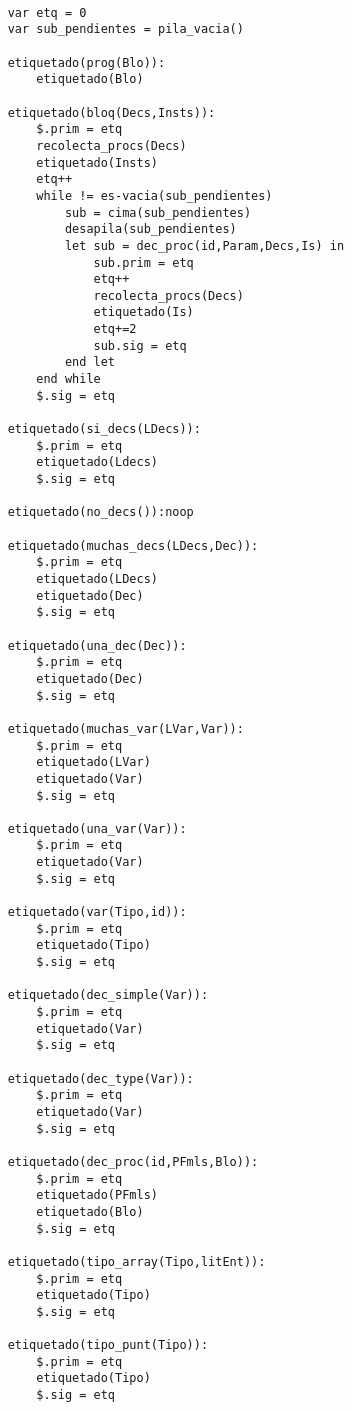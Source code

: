 \begin{lstlisting}

    var etq = 0 
    var sub_pendientes = pila_vacia()

    etiquetado(prog(Blo)):
        etiquetado(Blo)

    etiquetado(bloq(Decs,Insts)):
        $.prim = etq
        recolecta_procs(Decs)
        etiquetado(Insts)
        etq++
        while != es-vacia(sub_pendientes)
            sub = cima(sub_pendientes)
            desapila(sub_pendientes)
            let sub = dec_proc(id,Param,Decs,Is) in
                sub.prim = etq
                etq++
                recolecta_procs(Decs)
                etiquetado(Is)
                etq+=2
                sub.sig = etq
            end let
        end while
        $.sig = etq
    
    etiquetado(si_decs(LDecs)):
        $.prim = etq
        etiquetado(Ldecs)
        $.sig = etq
    
    etiquetado(no_decs()):noop
    
    etiquetado(muchas_decs(LDecs,Dec)):
        $.prim = etq
        etiquetado(LDecs)
        etiquetado(Dec)
        $.sig = etq
    
    etiquetado(una_dec(Dec)):
        $.prim = etq
        etiquetado(Dec)
        $.sig = etq

    etiquetado(muchas_var(LVar,Var)):
        $.prim = etq
        etiquetado(LVar)
        etiquetado(Var)
        $.sig = etq

    etiquetado(una_var(Var)):
        $.prim = etq
        etiquetado(Var)
        $.sig = etq
    
    etiquetado(var(Tipo,id)):
        $.prim = etq
        etiquetado(Tipo)
        $.sig = etq
    
    etiquetado(dec_simple(Var)):
        $.prim = etq
        etiquetado(Var)
        $.sig = etq

    etiquetado(dec_type(Var)):
        $.prim = etq
        etiquetado(Var)
        $.sig = etq
    
    etiquetado(dec_proc(id,PFmls,Blo)):
        $.prim = etq
        etiquetado(PFmls)
        etiquetado(Blo)
        $.sig = etq

    etiquetado(tipo_array(Tipo,litEnt)):
        $.prim = etq
        etiquetado(Tipo)
        $.sig = etq

    etiquetado(tipo_punt(Tipo)):
        $.prim = etq
        etiquetado(Tipo)
        $.sig = etq


\end{lstlisting}
